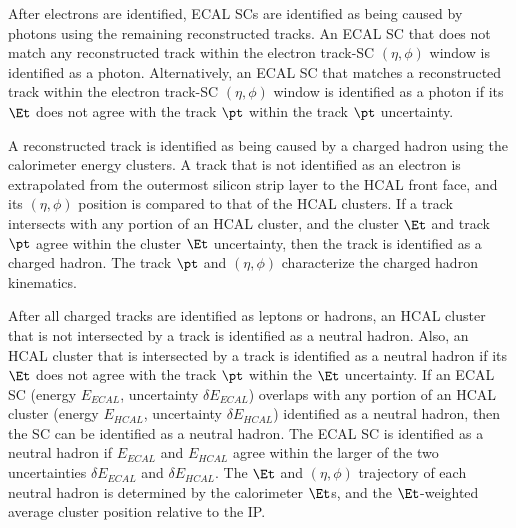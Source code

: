
After electrons are identified, ECAL SCs are identified as being caused by photons using the remaining reconstructed tracks.  An ECAL SC that does 
not match any reconstructed track within the electron track-SC $(\eta,\phi)$ window is identified as a photon.  Alternatively, an ECAL SC that 
matches a reconstructed track within the electron track-SC $(\eta,\phi)$ window is identified as a photon if its $\Et$ does not agree with the track 
$\pt$ within the track $\pt$ uncertainty.

A reconstructed track is identified as being caused by a charged hadron using the calorimeter energy clusters.  A track that is not 
identified as an electron is extrapolated from the outermost silicon strip layer to the HCAL front face, and its $(\eta,\phi)$ position is 
compared to that of the HCAL clusters.  If a track intersects with any portion of an HCAL cluster, and the cluster $\Et$ and track $\pt$ agree 
within the cluster $\Et$ uncertainty, then the track is identified as a charged hadron.  The track $\pt$ and $(\eta,\phi)$ characterize the charged 
hadron kinematics.

After all charged tracks are identified as leptons or hadrons, an HCAL cluster that is not intersected by a track is identified as a 
neutral hadron.  Also, an HCAL cluster that is intersected by a track is identified as a neutral hadron if its $\Et$ does not agree with 
the track $\pt$ within the $\Et$ uncertainty.  If an ECAL SC (energy $E_{ECAL}$, uncertainty $\delta E_{ECAL}$) 
overlaps with any portion of an HCAL cluster (energy $E_{HCAL}$, uncertainty $\delta E_{HCAL}$) identified as a neutral hadron, then the 
SC can be identified as a neutral hadron.  The ECAL SC is identified as a neutral hadron if $E_{ECAL}$ and $E_{HCAL}$ agree within the larger 
of the two uncertainties $\delta E_{ECAL}$ and $\delta E_{HCAL}$.  The $\Et$ and $(\eta,\phi)$ trajectory of each neutral hadron is determined 
by the calorimeter $\Et$s, and the $\Et$-weighted average cluster position relative to the IP.



